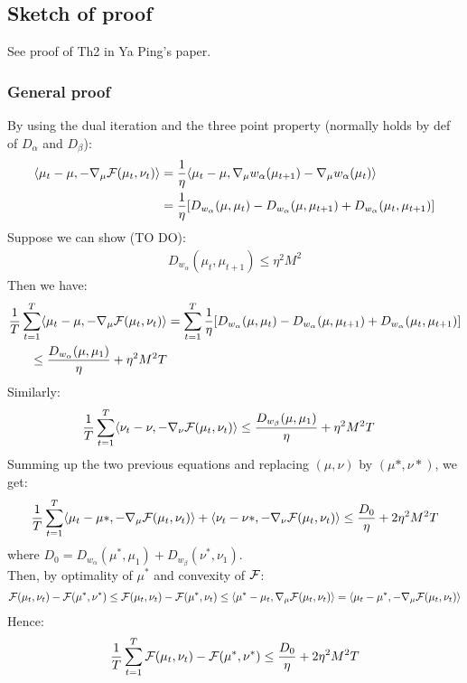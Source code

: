 \documentclass[a4paper, 10pt]{article}
\begin{document}
\subsection{Sketch of proof}

See proof of Th2 in Ya Ping's paper.

\subsubsection{General proof}

By using the dual iteration and the three point property (normally holds by def of $D_{\alpha}$ and $D_{\beta}$):
\begin{align*}
\langle \mu_t-\mu,-\nabla_{\mu} \mathcal{F}(\mu_t,\nu_t)\rangle&=\frac{1}{\eta}\langle \mu_t-\mu,\nabla_{\mu}w_{\alpha}(\mu_{t+1})-\nabla_{\mu}w_{\alpha}(\mu_t)\rangle\\
&=\frac{1}{\eta}[D_{w_{\alpha}}(\mu,\mu_{t})-D_{w_{\alpha}}(\mu,\mu_{t+1})+D_{w_{\alpha}}(\mu_t,\mu_{t+1})]
\end{align*}
Suppose we can show (TO DO): 
\begin{align}\label{eq:bound_gradient}
D_{w_{\alpha}}(\mu_t,\mu_{t+1})\le \eta^2 M^2
\end{align}
Then we have:
\begin{align*}
\frac{1}{T}\sum_{t=1}^T \langle \mu_t-\mu,-\nabla_{\mu} \mathcal{F}(\mu_t,\nu_t)\rangle&= \sum_{t=1}^T \frac{1}{\eta}[D_{w_{\alpha}}(\mu,\mu_{t})-D_{w_{\alpha}}(\mu,\mu_{t+1})+D_{w_{\alpha}}(\mu_t,\mu_{t+1})]\\
\le \frac{D_{w_{\alpha}}(\mu,\mu_1)}{\eta}+\eta^2 M^2 T
\end{align*}
Similarly:
\begin{align*}
\frac{1}{T}\sum_{t=1}^T \langle \nu_t-\nu,-\nabla_{\nu} \mathcal{F}(\mu_t,\nu_t)\rangle&
\le \frac{D_{w_{\beta}}(\mu,\mu_1)}{\eta}+\eta^2 M^2 T
\end{align*}
Summing up the two previous equations and replacing $(\mu,\nu)$ by $(\mu*,\nu*)$, we get:
\begin{equation}
\frac{1}{T}\sum_{t=1}^T \langle \mu_t-\mu*,-\nabla_{\mu} \mathcal{F}(\mu_t,\nu_t)\rangle + \langle \nu_t-\nu*,-\nabla_{\nu} \mathcal{F}(\mu_t,\nu_t)\rangle\le \frac{D_0}{\eta}+2\eta^2 M^2 T
\end{equation}
where $D_0=D_{w_{\alpha}}(\mu^*,\mu_1)+D_{w_{\beta}}(\nu^*,\nu_1)$.\\

\noindent Then, by optimality of $\mu^*$ and convexity of $\mathcal{F}$:
\begin{multline*}
\mathcal{F}(\mu_t,\nu_t)-\mathcal{F}(\mu^*,\nu^*)\le \mathcal{F}(\mu_t,\nu_t)-\mathcal{F}(\mu^*,\nu_t)
\le \langle \mu^*-\mu_t,\nabla_{\mu}\mathcal{F}(\mu_t,\nu_t)\rangle= \langle \mu_t-\mu^*,-\nabla_{\mu}\mathcal{F}(\mu_t,\nu_t)\rangle
\end{multline*}
Hence:
\begin{equation}
\frac{1}{T}\sum_{t=1}^T  
\mathcal{F}(\mu_t,\nu_t)-\mathcal{F}(\mu^*,\nu^*) \le \frac{D_0}{\eta}+2\eta^2 M^2 T
\end{equation}
\end{document}
